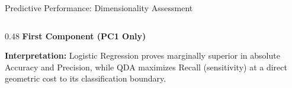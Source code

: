 \documentclass[8pt, aspectratio=169]{beamer}
\begin{document}
\begin{frame}{Predictive Performance: Dimensionality Assessment}
    \begin{columns}[T]
        \begin{column}{0.48\textwidth}
            \centering
            \textbf{First Component (PC1 Only)}
            \vspace{0.1cm}
            \begin{table}
            \end{table}
            \vspace{0.1cm}
            \justifying
            \scriptsize{\textbf{Interpretation:} Logistic Regression proves marginally superior in absolute Accuracy and Precision, while QDA maximizes Recall (sensitivity) at a direct geometric cost to its classification boundary.}
        \end{column}
        

\end{columns}
\end{frame}
\end{document}
